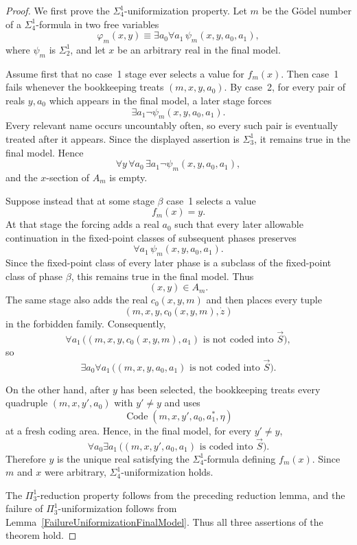 \documentclass[a4paper,11pt]{article}
\begin{document}
\begin{proof}
We first prove the $\Sigma^1_4$-uniformization property. Let $m$ be the G\"odel number of a $\Sigma^1_4$-formula in two free variables
\[
\varphi_m(x,y)\equiv\exists a_0\forall a_1\,\psi_m(x,y,a_0,a_1),
\]
where $\psi_m$ is $\Sigma^1_2$, and let $x$ be an arbitrary real in the final model.

Assume first that no case~1 stage ever selects a value for $f_m(x)$. Then case~1 fails whenever the bookkeeping treats $(m,x,y,a_0)$. By case~2, for every pair of reals $y,a_0$ which appears in the final model, a later stage forces
\[
\exists a_1\neg\psi_m(x,y,a_0,a_1).
\]
Every relevant name occurs uncountably often, so every such pair is eventually treated after it appears. Since the displayed assertion is $\Sigma^1_3$, it remains true in the final model. Hence
\[
\forall y\,\forall a_0\,\exists a_1\neg\psi_m(x,y,a_0,a_1),
\]
and the $x$-section of $A_m$ is empty.

Suppose instead that at some stage $\beta$ case~1 selects a value
\[
f_m(x)=y.
\]
At that stage the forcing adds a real $a_0$ such that every later allowable continuation in the fixed-point classes of subsequent phases preserves
\[
\forall a_1\,\psi_m(x,y,a_0,a_1).
\]
Since the fixed-point class of every later phase is a subclass of the fixed-point class of phase $\beta$, this remains true in the final model. Thus
\[
(x,y)\in A_m.
\]
The same stage also adds the real $c_0(x,y,m)$ and then places every tuple
\[
(m,x,y,c_0(x,y,m),\dot z)
\]
in the forbidden family. Consequently,
\[
\forall a_1\,
\bigl((m,x,y,c_0(x,y,m),a_1)\text{ is not coded into }\vec S\bigr),
\]
so
\[
\exists a_0\forall a_1\,
\bigl((m,x,y,a_0,a_1)\text{ is not coded into }\vec S\bigr).
\]

On the other hand, after $y$ has been selected, the bookkeeping treats every quadruple $(m,x,y',a_0)$ with $y'\neq y$ and uses
\[
\operatorname{Code}(m,x,y',a_0,a_1^*,\eta)
\]
at a fresh coding area. Hence, in the final model, for every $y'\neq y$,
\[
\forall a_0\exists a_1\,
\bigl((m,x,y',a_0,a_1)\text{ is coded into }\vec S\bigr).
\]
Therefore $y$ is the unique real satisfying the $\Sigma^1_4$-formula defining $f_m(x)$. Since $m$ and $x$ were arbitrary, $\Sigma^1_4$-uniformization holds.

The $\Pi^1_3$-reduction property follows from the preceding reduction lemma, and the failure of $\Pi^1_3$-uniformization follows from Lemma~\ref{FailureUniformizationFinalModel}. Thus all three assertions of the theorem hold.
\end{proof}
\end{document}
